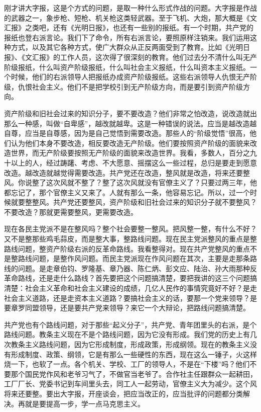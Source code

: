 刚才讲大字报，这是个方式的问题，是取一种什么形式作战的问题。大字报是作战的武器之一，象步枪、短枪、机关枪这类轻武器。至于飞机、大炮，那大概是《文汇报》之类吧，还有《光明日报》，也还有一些别的报纸。有一个时期，共产党的报纸也登右派言论。我们下了命令，所有右派言论，要照原样注销来。我们运用这种方式，以及其它各种方式，使广大群众从正反两面受到了教育。比如《光明日报》、《文汇报》的工作人员，这次得了很深刻的教育。他们过去分不清什么叫无产阶级报纸，什么叫资产阶级报纸，什么叫社会主义报纸，什么叫资本主义报纸。一个时候，他们的右派领导人把报纸办成资产阶级报纸。这些右派领导人仇恨无产阶级，仇恨社会主义。他们不是把学校引到无产阶级方向，而是要引到资产阶级方向。

资产阶级和旧社会过来的知识分子，要不要改造？他们非常之怕改造，说改造就出那么一种感，叫做“自卑感”，越改就越卑。这是一种错误的说法。应当是越改造越自尊，应当是自尊感，因为是自己觉悟到需要改造。那些人的“阶级觉悟”很高，他们认为他们本身不要改造，相反要改造无产阶级。他们要按照资产阶级的面貌来改造世界，而无产阶级要按照无产阶级的面貌来改造世界。我看，多数人，百分之九十以上的人，经过踌躇、考虑、不大愿意、摇摆这么一些过程，总归是要走到愿意改造。越改造就越觉得需要改造。共产党还在改造，整风就是改造，将来还要整风。你说整了这次风就不整了？整了这次风就没有官僚主义了？只要过两三年，他都忘记了，那个官僚主义又来了。人就有那么一条，他容易忘记。所以，过一个时候就要整整风。共产党还要整风，资产阶级和旧社会过来的知识分子就不要整风？不要改造？那就更需要整风，更需要改造。

现在各民主党派不是在整风吗？整个社会要整一整风。把风整一整，有什么不好？又不是整那些鸡毛蒜皮，而是整大事，整路线问题。现在民主党派整风的重点是整路线问题，整资产阶级右派的反革命路线。我看整得对。现在共产党整风的重点不是整路线问题，是整作风问题。而民主党派现在作风问题在其次，主要是走那条路线的问题。是走章伯钧、罗隆基、章乃器、陈仁炳、彭文应、陆治、孙大雨那种反革命路线，还是走什么路线？首先要把这个问题搞清楚，要把我讲的这三个问题搞清楚：社会主义革命和社会主义建设的成绩，几亿人民作的事情究竟好不好？是走社会主义道路，还是走资本主义道路？要搞社会主义的话，要那一个党来领导？是要章罗同盟领导，还是要共产党来领导？来它一个大辩论，把路线问题搞清楚。

共产党也有个路线问题，对于那些“起义分子”，共产党、青年团里头的右派，是个路线问题。教条主义现在不是个路线问题，因为它没有形成。我们党的历史上有几次教条主义路线问题，因为它形成制度，形成政策，形成纲领。现在的教条主义没有形成制度、政策、纲领，它是有那么一些硬性的东西，现在这么一锤子，火这样烧一下，也软了一点。各个机关、学校、工厂的领导人，不是在“下楼”吗？他们不要那个国民党作风和老爷习气了，不做官当老爷了。合作社主任跟群众一起耕田，工厂厂长、党委书记到车间里头去，同工人一起劳动，官僚主义大为减少。这个风将来还要整。要出大字报，开座谈会，把应当改正的，应当批评的问题都分类解决。再就是要提高一步，学一点马克思主义。

